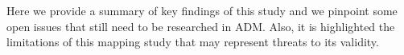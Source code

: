 Here we provide a summary of key findings of this study and we pinpoint some open issues that still need to be researched in ADM. Also, it is highlighted the limitations of this mapping study that may represent threats to its validity.
